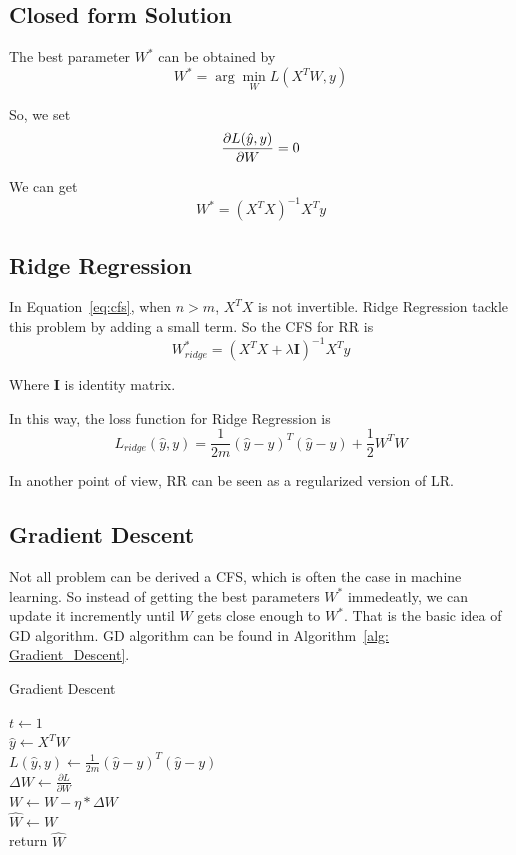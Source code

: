 \documentclass[journal, a4paper]{IEEEtran}
\begin{document}
\subsection{Closed form Solution}
The best parameter $W^{*}$ can be obtained by \\
\begin{equation}
 W^{*} = \arg\min_{W}L(X^{T}W, y)  
\end{equation} \par
So, we set 
\begin{equation}
\frac{\partial L(\hat{y}, y)}{\partial W} = 0 \\
\end{equation} \par
We can get 
\begin{equation}
\label{eq:cfs}
W^{*} = (X^{T}X)^{-1}X^{T}y
\end{equation}
\subsection{Ridge Regression}
In Equation~\ref{eq:cfs}, when $n > m$, $X^{T}X$ is not invertible. Ridge Regression tackle this problem by adding a small term. So the CFS for RR is
\begin{equation}
W_{ridge}^{*} = (X^{T}X + \lambda \mathbf{I})^{-1}X^{T}y
\end{equation} \par
Where $\mathbf{I}$ is identity matrix. \par
In this way, the loss function for Ridge Regression is
\begin{equation}
L_{ridge}(\hat{y}, y) = \frac{1}{2m}(\hat{y} - y)^{T}(\hat{y} - y)  + \frac{1}{2} W^{T} W
\end{equation} \par
In another point of view, RR can be seen as a regularized version of LR.
\subsection{Gradient Descent}
Not all problem can be derived a CFS, which is often the case in machine learning. So instead of getting the best parameters $W^{*}$ immedeatly, we can update it incremently until $W$ gets close enough to $W^{*}$. That is the basic idea of GD algorithm. GD algorithm can be found in Algorithm~\ref{alg: Gradient_Descent}. 
\begin{algorithm}

	\label{alg: Gradient_Descent}
	\caption{Gradient Descent}
	$t \gets 1$ \\
	{
		$\hat{y} \gets X^{T}W $ \\
		$ L(\hat{y}, y) \gets \frac{1}{2m}(\hat{y} - y)^{T}(\hat{y} - y)$ \\
		$\Delta{W} \gets \frac{\partial L}{\partial W}$ \\
		$W \gets W - \eta * \Delta{W}$ \\
	}
	$\hat{W} \gets W$ \\
	return $\hat{W}$
\end{algorithm}
\end{document}
